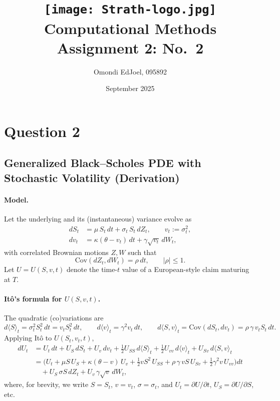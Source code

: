 \documentclass[11pt]{article}
\title{\texttt{[image: Strath-logo.jpg]}\\Computational Methods Assignment 2: No.\ 2}
\author{Omondi EdJoel, 095892}
\date{September 2025}
\begin{document}
\maketitle

\section{Question 2}
\subsection{Generalized Black--Scholes PDE with Stochastic Volatility (Derivation)}

\paragraph{Model.}
Let the underlying and its (instantaneous) variance evolve as
\begin{align*}
    dS_t &= \mu\,S_t\,dt + \sigma_t\,S_t\,dZ_t, 
    \qquad v_t := \sigma_t^{2},\\
    dv_t &= \kappa(\theta - v_t)\,dt + \gamma \sqrt{v_t}\,dW_t,
\end{align*}
with correlated Brownian motions $Z,W$ such that
\[
\mathrm{Cov}(dZ_t,dW_t)=\rho\,dt, \qquad |\rho|\le 1.
\]
Let $U=U(S,v,t)$ denote the time-$t$ value of a European-style claim maturing at $T$.

\paragraph{It\^o's formula for $U(S,v,t)$.}
The quadratic (co)variations are
\[
d\langle S\rangle_t = \sigma_t^2 S_t^2\,dt = v_t S_t^2\,dt,\qquad
d\langle v\rangle_t = \gamma^2 v_t\,dt,\qquad
d\langle S,v\rangle_t = \mathrm{Cov}(dS_t,dv_t) = \rho\,\gamma\,v_t S_t\,dt.
\]
Applying It\^o to $U(S_t,v_t,t)$,
\begin{align*}
dU_t
&= U_t\,dt + U_S\,dS_t + U_v\,dv_t
   + \tfrac12 U_{SS}\,d\langle S\rangle_t
   + \tfrac12 U_{vv}\,d\langle v\rangle_t
   + U_{Sv}\,d\langle S,v\rangle_t\\[4pt]
&= \Big(
      U_t
    + \mu S\,U_S
    + \kappa(\theta - v)\,U_v
    + \tfrac12 v S^2\,U_{SS}
    + \rho\,\gamma\,v S\,U_{Sv}
    + \tfrac12 \gamma^2 v\,U_{vv}
   \Big) dt
   \\
&\quad
 + U_S\,\sigma S\,dZ_t
 + U_v\,\gamma \sqrt{v}\,dW_t,
\end{align*}
where, for brevity, we write $S=S_t$, $v=v_t$, $\sigma=\sigma_t$, and $U_t=\partial U/\partial t$, $U_S=\partial U/\partial S$, etc.
\end{document}
